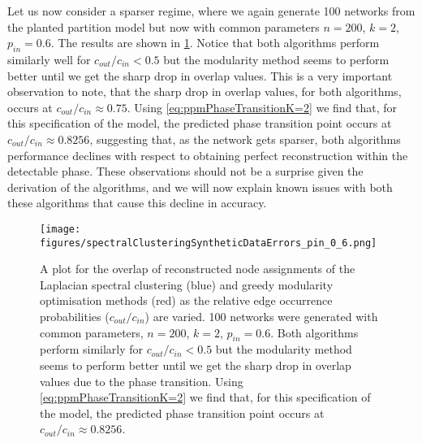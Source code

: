 Let us now consider a sparser regime, where we again generate 100 networks from the planted partition model but now with common parameters $n=200$, $k=2$, $p_{in}=0.6$.
The results are shown in \cref{fig:syntheticDataResultsPin0.6}.
Notice that both algorithms perform similarly well for $c_{out}/c_{in} < 0.5$ but the modularity method seems to perform better until we get the sharp drop in overlap values.
This is a very important observation to note, that the sharp drop in overlap values, for both algorithms, occurs at $c_{out}/c_{in} \approx 0.75$.
Using \cref{eq:ppmPhaseTransitionK=2} we find that, for this specification of the model, the predicted phase transition point occurs at $c_{out}/c_{in} \approx 0.8256$, suggesting that, as the network gets sparser, both algorithms performance declines with respect to obtaining perfect reconstruction within the detectable phase.
These observations should not be a surprise given the derivation of the algorithms, and we will now explain known issues with both these algorithms that cause this decline in accuracy.

\begin{figure}
	\centering
	\texttt{[image: figures/spectralClusteringSyntheticDataErrors\_pin\_0\_6.png]}
	\caption[Plot of overlap for spectral clustering and modularity methods in the sparse regime.]{\label{fig:syntheticDataResultsPin0.6} A plot for the overlap of reconstructed node assignments of the Laplacian spectral clustering (blue) and greedy modularity optimisation methods (red) as the relative edge occurrence probabilities ($c_{out}/c_{in}$) are varied. 100 networks were generated with common parameters, $n=200$, $k=2$, $p_{in}=0.6$. Both algorithms perform similarly for $c_{out}/c_{in} < 0.5$ but the modularity method seems to perform better until we get the sharp drop in overlap values due to the phase transition. Using \cref{eq:ppmPhaseTransitionK=2} we find that, for this specification of the model, the predicted phase transition point occurs at $c_{out}/c_{in} \approx 0.8256$.}
\end{figure}


